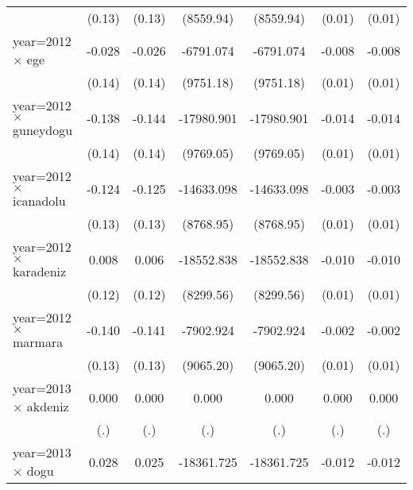 {\begin{tabular}{l*{6}{c}}
                    &      (0.13)         &      (0.13)         &   (8559.94)         &   (8559.94)         &      (0.01)         &      (0.01)         \\
year=2012 $\times$ ege&      -0.028         &      -0.026         &   -6791.074         &   -6791.074         &      -0.008         &      -0.008         \\
                    &      (0.14)         &      (0.14)         &   (9751.18)         &   (9751.18)         &      (0.01)         &      (0.01)         \\
year=2012 $\times$ guneydogu&      -0.138         &      -0.144         &  -17980.901         &  -17980.901         &      -0.014         &      -0.014         \\
                    &      (0.14)         &      (0.14)         &   (9769.05)         &   (9769.05)         &      (0.01)         &      (0.01)         \\
year=2012 $\times$ icanadolu&      -0.124         &      -0.125         &  -14633.098         &  -14633.098         &      -0.003         &      -0.003         \\
                    &      (0.13)         &      (0.13)         &   (8768.95)         &   (8768.95)         &      (0.01)         &      (0.01)         \\
year=2012 $\times$ karadeniz&       0.008         &       0.006         &  -18552.838\sym{*}  &  -18552.838\sym{*}  &      -0.010         &      -0.010         \\
                    &      (0.12)         &      (0.12)         &   (8299.56)         &   (8299.56)         &      (0.01)         &      (0.01)         \\
year=2012 $\times$ marmara&      -0.140         &      -0.141         &   -7902.924         &   -7902.924         &      -0.002         &      -0.002         \\
                    &      (0.13)         &      (0.13)         &   (9065.20)         &   (9065.20)         &      (0.01)         &      (0.01)         \\
year=2013 $\times$ akdeniz&       0.000         &       0.000         &       0.000         &       0.000         &       0.000         &       0.000         \\
                    &         (.)         &         (.)         &         (.)         &         (.)         &         (.)         &         (.)         \\
year=2013 $\times$ dogu&       0.028         &       0.025         &  -18361.725\sym{*}  &  -18361.725\sym{*}  &      -0.012         &      -0.012         \\

\end{tabular}}
